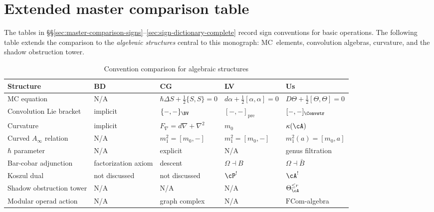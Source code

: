 \section{Extended master comparison table}
\label{sec:extended-master-comparison}

The tables in \S\S\ref{sec:master-comparison-signs}--\ref{sec:sign-dictionary-complete}
record sign conventions for basic operations. The following table extends the
comparison to the \emph{algebraic structures} central to this monograph: MC~elements,
convolution algebras, curvature, and the shadow obstruction tower.

\begin{table}[H]
\centering
\caption{Convention comparison for algebraic structures}
\label{tab:algebraic-structures-comparison}
\renewcommand{\arraystretch}{1.5}
\footnotesize
\begin{tabular}{|>{\raggedright\arraybackslash}p{3.6cm}|>{\raggedright\arraybackslash}p{2.5cm}|>{\raggedright\arraybackslash}p{2.5cm}|>{\raggedright\arraybackslash}p{2.2cm}|>{\raggedright\arraybackslash}p{2.5cm}|}
\hline
\textbf{Structure} & \textbf{BD} & \textbf{CG} & \textbf{LV} & \textbf{Us} \\
\hline
\hline
MC equation & N/A & $\hbar\Delta S + \frac{1}{2}\{S,S\}=0$ & $d\alpha + \frac{1}{2}[\alpha,\alpha]=0$ & $D\Theta + \frac{1}{2}[\Theta,\Theta]=0$ \\
\hline
Convolution Lie bracket & implicit & $\{-,-\}_{\BV}$ & $[-,-]_{\mathrm{pre}}$ & $[-,-]_{\Convstr}$ \\
\hline
Curvature & implicit & $F_\nabla = d\nabla + \nabla^2$ & $m_0$ & $\kappa(\cA)$ \\
\hline
Curved $A_\infty$ relation & N/A & $m_1^2 = [m_0,-]$ & $m_1^2 = [m_0,-]$ & $m_1^2(a)=[m_0,a]$ \\
\hline
$\hbar$ parameter & N/A & explicit & N/A & genus filtration \\
\hline
Bar-cobar adjunction & factorization axiom & descent & $\Omega \dashv B$ & $\Omega \dashv \bar{B}$ \\
\hline
Koszul dual & not discussed & not discussed & $\cP^!$ & $\cA^!$ \\
\hline
Shadow obstruction tower & N/A & N/A & N/A & $\Theta_\cA^{\leq r}$ \\
\hline
Modular operad action & N/A & graph complex & N/A & $\mathrm{FCom}$-algebra \\
\hline
\end{tabular}
\end{table}

